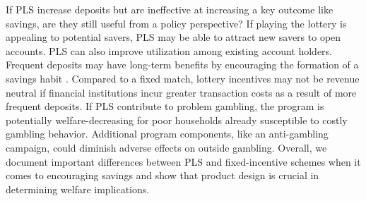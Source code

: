\documentclass[11pt]{article}
\begin{document}
		If PLS increase deposits but are ineffective at increasing a key outcome like savings, are they still useful from a policy perspective? If playing the lottery is appealing to potential savers, PLS may be able to attract new savers to open  accounts. PLS can also improve utilization among existing account holders. Frequent deposits may have long-term benefits by encouraging the formation of a savings habit \parencite{alessie_saving_2009}. Compared to a fixed match, lottery incentives may not be revenue neutral if financial institutions incur greater transaction costs as a result of more frequent deposits. If PLS contribute to problem gambling, the program is potentially welfare-decreasing for poor households already susceptible to costly gambling behavior. Additional program components, like an anti-gambling campaign, could diminish adverse effects on outside gambling. Overall, we document important differences between PLS and fixed-incentive schemes when it comes to encouraging savings and show that product design is crucial in determining welfare implications.


\end{document}
